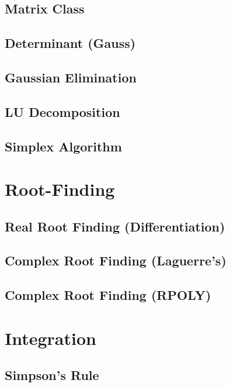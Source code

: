 \subsection{Matrix Class}

\subsection{Determinant (Gauss)}

\subsection{Gaussian Elimination}

\subsection{LU Decomposition}

\subsection{Simplex Algorithm}


\section{Root-Finding}
\setcounter{section}{6}
\setcounter{subsection}{0}
\subsection{Real Root Finding (Differentiation)}

\subsection{Complex Root Finding (Laguerre's)}

\subsection{Complex Root Finding (RPOLY)}


\section{Integration}
\setcounter{section}{7}
\setcounter{subsection}{0}
\subsection{Simpson's Rule}

